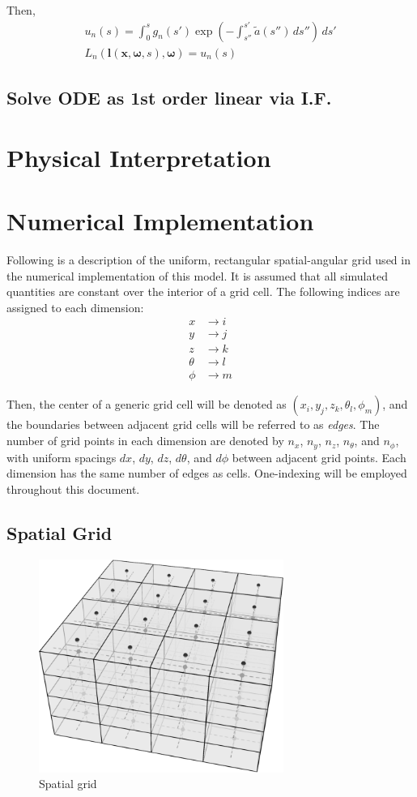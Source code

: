 \documentclass[10pt]{article}
\renewcommand\vec{\mathbf}
\begin{document}
Then,
\begin{align}
  u_n(s) = \int_0^sg_n(s')\exp\left( -\int_{s''}^{s'}\tilde{a}(s'')\,ds'' \right)\, ds' \\
  L_n(\vec{l}(\vec{x}, \vec{\omega}, s), \vec{\omega}) = u_n(s)
\end{align}

\subsection{Solve ODE as 1st order linear via I.F.}

\section{Physical Interpretation}

\section{Numerical Implementation}

Following is a description of the uniform, rectangular spatial-angular grid used
in the numerical implementation of this model.
It is assumed that all simulated quantities are constant over the interior of a
grid cell.
The following indices are assigned to each dimension:
\begin{align}
  x &\to i \\
  y &\to j \\
  z &\to k \\
  \theta &\to l \\
  \phi &\to m
\end{align}

Then, the center of a generic grid cell will be denoted as
$(x_i,y_j,z_k,\theta_l,\phi_m)$, and the boundaries between adjacent grid cells
will be referred to as \textit{edges}.
The number of grid points in each dimension are denoted by $n_x$, $n_y$, $n_z$,
$n_\theta$, and $n_\phi$, with uniform spacings $dx$, $dy$, $dz$, $d\theta$, and
$d\phi$ between adjacent grid points.
Each dimension has the same number of edges as cells.
One-indexing will be employed throughout this document.
\subsection{Spatial Grid}
\begin{figure}[H]
  \centering
  \includegraphics[width=8cm]{spatialgrid.pdf}
  \caption{Spatial grid}
  \label{fig:spatial_grid}
\end{figure}
\end{document}

